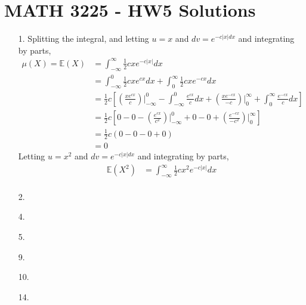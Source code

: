 \documentclass[a4paper,12pt]{article}
\begin{document}
\section*{MATH 3225 - HW5 Solutions}
\begin{enumerate}
    \item[1.] 
        Splitting the integral, and letting $u = x$ and $dv = e^{-c|x|dx}$ and integrating by parts,
        \begin{align*}
            \mu(X) = \mathbb{E}(X) &= \int_{-\infty}^\infty \frac{1}{2} cxe^{-c|x|} dx \\
            &= \int_{-\infty}^0 \frac{1}{2} cxe^{cx} dx + \int_{0}^\infty \frac{1}{2} cxe^{-cx} dx \\
            &= \frac{1}{2}c \left[ \left( \frac{xe^{cx}}{c} \right) \biggr\rvert_{-\infty}^0 - \int_{-\infty}^{0} \frac{e^{cx}}{c} dx + \left( \frac{xe^{-cx}}{-c} \right) \biggr\rvert_{0}^\infty + \int_{0}^{\infty} \frac{e^{-cx}}{c} dx \right] \\
            &= \frac{1}{2}c \left[ 0 - 0 - \left( \frac{e^{cx}}{c^2} \right) \biggr\rvert_{-\infty}^0 + 0 - 0 + \left( \frac{e^{-cx}}{-c^2} \right) \biggr\rvert_{0}^\infty \right] \\
            &= \frac{1}{2}c (0 - 0 - 0 + 0) \\
            &= 0
        \end{align*}
        Letting $u = x^2$ and $dv = e^{-c|x|dx}$ and integrating by parts,
        \begin{align*}
            \mathbb{E}(X^2) &= \int_{-\infty}^\infty \frac{1}{2} cx^2 e^{-c|x|} dx \\
        \end{align*}

    \item[2.] 

    \item[4.] 

    \item[5.] 

    \item[9.] 

    \item[10.] 

    \item[14.] 

\end{enumerate}
\end{document}

